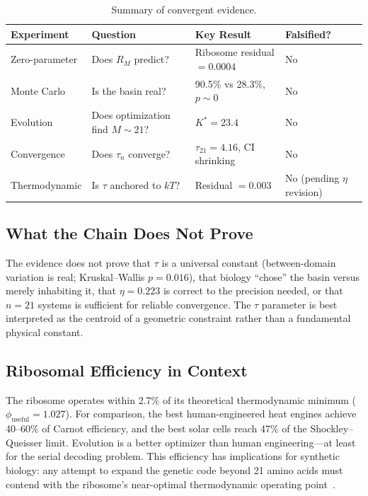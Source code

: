 \documentclass[12pt,a4paper]{article}
\begin{document}
\begin{table}[ht]
\centering
\caption{Summary of convergent evidence.}
\begin{tabular}{llll}
\toprule
Experiment & Question & Key Result & Falsified? \\
\midrule
Zero-parameter & Does $R_M$ predict? & Ribosome residual $= 0.0004$ & No \\
Monte Carlo & Is the basin real? & 90.5\% vs 28.3\%, $p \sim 0$ & No \\
Evolution & Does optimization find $M \sim 21$? & $K^* = 23.4$ & No \\
Convergence & Does $\tau_n$ converge? & $\tau_{21} = 4.16$, CI shrinking & No \\
Thermodynamic & Is $\tau$ anchored to $kT$? & Residual $= 0.003$ & No (pending $\eta$ revision) \\
\bottomrule
\end{tabular}
\label{tab:summary}
\end{table}

\subsection{What the Chain Does Not Prove}

The evidence does not prove that $\tau$ is a universal constant (between-domain variation is real; Kruskal--Wallis $p = 0.016$), that biology ``chose'' the basin versus merely inhabiting it, that $\eta = 0.223$ is correct to the precision needed, or that $n = 21$ systems is sufficient for reliable convergence. The $\tau$ parameter is best interpreted as the centroid of a geometric constraint rather than a fundamental physical constant.

\subsection{Ribosomal Efficiency in Context}

The ribosome operates within 2.7\% of its theoretical thermodynamic minimum ($\phi_{\mathrm{useful}} = 1.027$). For comparison, the best human-engineered heat engines achieve 40--60\% of Carnot efficiency, and the best solar cells reach 47\% of the Shockley--Queisser limit. Evolution is a better optimizer than human engineering---at least for the serial decoding problem. This efficiency has implications for synthetic biology: any attempt to expand the genetic code beyond 21 amino acids must contend with the ribosome's near-optimal thermodynamic operating point~\cite{zaher2009}.
\end{document}
